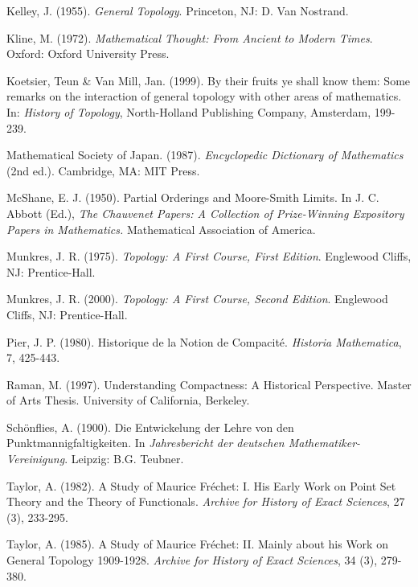 \documentclass[12pt]{article}
\begin{document}
\begin{thebibliography}{99}
 Kelley, J. (1955). {\em General Topology}. Princeton, NJ: D. Van Nostrand.

 Kline, M. (1972). {\em Mathematical Thought: From Ancient to Modern Times}.
Oxford: Oxford University Press.

 Koetsier, Teun \& Van Mill, Jan. (1999). By their fruits ye shall know them:  Some remarks on the interaction of general topology with other areas of mathematics. In: {\em History of Topology}, North-Holland Publishing Company, Amsterdam, 199-239. 

 Mathematical Society of Japan. (1987). {\em Encyclopedic Dictionary of
Mathematics} (2nd ed.). Cambridge, MA: MIT Press.

 McShane, E. J. (1950). Partial Orderings and Moore-Smith Limits. In J.
C. Abbott (Ed.), {\em The Chauvenet Papers:  A Collection of Prize-Winning Expository
Papers in Mathematics.} Mathematical Association of America.

 Munkres, J. R. (1975). {\em Topology: A First Course, First Edition}. Englewood Cliffs, NJ:
Prentice-Hall.

 Munkres, J. R. (2000). {\em Topology: A First Course, Second Edition}. Englewood Cliffs, NJ:
Prentice-Hall.


 Pier, J. P. (1980). Historique de la Notion de Compacit\'{e}.
{\em Historia Mathematica}, 7, 425-443.

 Raman, M. (1997). Understanding Compactness: A Historical Perspective. Master of Arts Thesis. University of California, Berkeley.




 Sch\"{o}nflies, A. (1900). Die Entwickelung der Lehre von den Punktmannigfaltigkeiten. In {\em Jahresbericht der deutschen Mathematiker-Vereinigung}. Leipzig: B.G. Teubner. 

 Taylor, A. (1982). A Study of Maurice Fr\'{e}chet: I. His Early Work on Point Set Theory and the Theory of Functionals. \emph{Archive for History of Exact Sciences}, 27 (3), 233-295.

 Taylor, A. (1985). A Study of Maurice Fr\'{e}chet: II. Mainly about
his Work on General Topology 1909-1928. {\em Archive for History of Exact Sciences}, 34 (3),
279-380.


\end{thebibliography}
\end{document}
